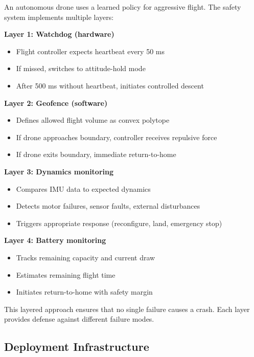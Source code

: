 \begin{example}
\label{ex:safety_drone}
An autonomous drone uses a learned policy for aggressive flight. The safety system implements multiple layers:

\textbf{Layer 1: Watchdog (hardware)}
\begin{itemize}
    \item Flight controller expects heartbeat every 50 ms
    \item If missed, switches to attitude-hold mode
    \item After 500 ms without heartbeat, initiates controlled descent
\end{itemize}

\textbf{Layer 2: Geofence (software)}
\begin{itemize}
    \item Defines allowed flight volume as convex polytope
    \item If drone approaches boundary, controller receives repulsive force
    \item If drone exits boundary, immediate return-to-home
\end{itemize}

\textbf{Layer 3: Dynamics monitoring}
\begin{itemize}
    \item Compares IMU data to expected dynamics
    \item Detects motor failures, sensor faults, external disturbances
    \item Triggers appropriate response (reconfigure, land, emergency stop)
\end{itemize}

\textbf{Layer 4: Battery monitoring}
\begin{itemize}
    \item Tracks remaining capacity and current draw
    \item Estimates remaining flight time
    \item Initiates return-to-home with safety margin
\end{itemize}

This layered approach ensures that no single failure causes a crash. Each layer provides defense against different failure modes.
\end{example}

\subsection{Deployment Infrastructure}

